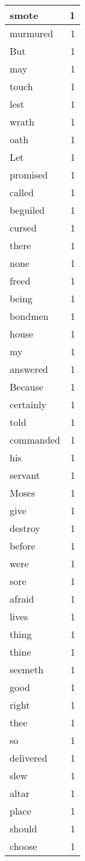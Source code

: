 \begin{center}
\begin{longtable}{l|r}
smote & 1\\ \hline 
murmured & 1\\ \hline 
But & 1\\ \hline 
may & 1\\ \hline 
touch & 1\\ \hline 
lest & 1\\ \hline 
wrath & 1\\ \hline 
oath & 1\\ \hline 
Let & 1\\ \hline 
promised & 1\\ \hline 
called & 1\\ \hline 
beguiled & 1\\ \hline 
cursed & 1\\ \hline 
there & 1\\ \hline 
none & 1\\ \hline 
freed & 1\\ \hline 
being & 1\\ \hline 
bondmen & 1\\ \hline 
house & 1\\ \hline 
my & 1\\ \hline 
answered & 1\\ \hline 
Because & 1\\ \hline 
certainly & 1\\ \hline 
told & 1\\ \hline 
commanded & 1\\ \hline 
his & 1\\ \hline 
servant & 1\\ \hline 
Moses & 1\\ \hline 
give & 1\\ \hline 
destroy & 1\\ \hline 
before & 1\\ \hline 
were & 1\\ \hline 
sore & 1\\ \hline 
afraid & 1\\ \hline 
lives & 1\\ \hline 
thing & 1\\ \hline 
thine & 1\\ \hline 
seemeth & 1\\ \hline 
good & 1\\ \hline 
right & 1\\ \hline 
thee & 1\\ \hline 
so & 1\\ \hline 
delivered & 1\\ \hline 
slew & 1\\ \hline 
altar & 1\\ \hline 
place & 1\\ \hline 
should & 1\\ \hline 
choose & 1\\ \hline 
\end{longtable}
\end{center}



